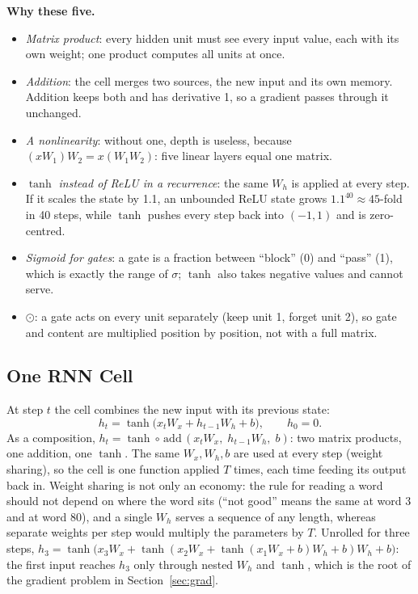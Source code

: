 \textbf{Why these five.}
\begin{itemize}
\item \emph{Matrix product}: every hidden unit must see every input value, each with its own weight; one product computes all units at once.
\item \emph{Addition}: the cell merges two sources, the new input and its own memory. Addition keeps both and has derivative 1, so a gradient passes through it unchanged.
\item \emph{A nonlinearity}: without one, depth is useless, because $(xW_1)W_2=x(W_1W_2)$: five linear layers equal one matrix.
\item \emph{$\tanh$ instead of ReLU in a recurrence}: the same $W_h$ is applied at every step. If it scales the state by 1.1, an unbounded ReLU state grows $1.1^{40}\approx45$-fold in 40 steps, while $\tanh$ pushes every step back into $(-1,1)$ and is zero-centred.
\item \emph{Sigmoid for gates}: a gate is a fraction between ``block'' (0) and ``pass'' (1), which is exactly the range of $\sigma$; $\tanh$ also takes negative values and cannot serve.
\item \emph{$\odot$}: a gate acts on every unit separately (keep unit 1, forget unit 2), so gate and content are multiplied position by position, not with a full matrix.
\end{itemize}

\subsection{One RNN Cell}

At step $t$ the cell combines the new input with its previous state:
\begin{equation}
h_t=\tanh\big(x_tW_x+h_{t-1}W_h+b\big),\qquad h_0=0 .
\end{equation}
As a composition, $h_t=\tanh\circ\,\mathrm{add}\,(x_tW_x,\;h_{t-1}W_h,\;b)$: two matrix products, one addition, one $\tanh$. The same $W_x,W_h,b$ are used at every step (weight sharing),
so the cell is one function applied $T$ times, each time feeding its output back in. Weight sharing is not only an economy: the rule for reading a word should not depend on where the
word sits (``not good'' means the same at word 3 and at word 80), and a single $W_h$ serves a sequence of any length, whereas separate weights per step would multiply the parameters by $T$.
Unrolled for three steps, $h_3=\tanh\!\big(x_3W_x+\tanh(x_2W_x+\tanh(x_1W_x+b)W_h+b)W_h+b\big)$: the first input reaches $h_3$ only through nested $W_h$ and $\tanh$,
which is the root of the gradient problem in Section~\ref{sec:grad}.

